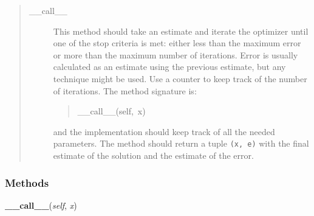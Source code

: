 \begin{quote}
\begin{description}
\item[{{\_}{\_}call{\_}{\_}}] %

This method should take an estimate and iterate the optimizer until one
of the stop criteria is met: either less than the maximum error or more
than the maximum number of iterations. Error is usually calculated as an
estimate using the previous estimate, but any technique might be used.
Use a counter to keep track of the number of iterations. The method
signature is:
\begin{quote}{\ttfamily \raggedright \noindent
{\_}{\_}call{\_}{\_}(self,~x)
}\end{quote}

and the implementation should keep track of all the needed parameters.
The method should return a tuple \texttt{(x, e)} with the final estimate of
the solution and the estimate of the error.

\end{description}
\end{quote}


  \subsubsection{Methods}

    \label{peach:optm:optm:Optimizer:__call__}

    \vspace{0.5ex}

    \begin{boxedminipage}{\textwidth}

    \raggedright \textbf{\_\_call\_\_}(\textit{self}, \textit{x})

    \end{boxedminipage}

    \label{object:__delattr__}

    \vspace{0.5ex}

